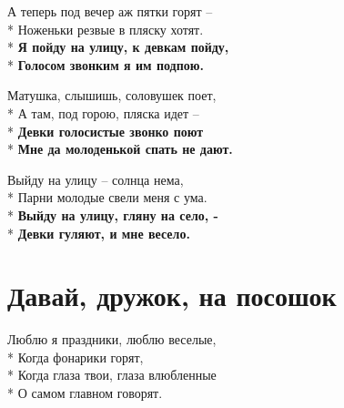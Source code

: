 \medskip

\begin{minipage}{\linewidth}
А теперь под вечер аж пятки горят –\\*
Ноженьки резвые в пляску хотят.\\*
\textbf{Я пойду на улицу, к девкам пойду,}\\*
\textbf{Голосом звонким я им подпою.}\\
\end{minipage}\par\medskip\nobreak

\medskip

\begin{minipage}{\linewidth}
Матушка, слышишь, соловушек поет,\\*
А там, под горою, пляска идет –\\*
\textbf{Девки голосистые звонко поют}\\*
\textbf{Мне да молоденькой спать не дают.}\\
\end{minipage}\par\medskip\nobreak

\medskip

\begin{minipage}{\linewidth}
Выйду на улицу – солнца нема,\\*
Парни молодые свели меня с ума.\\*
\textbf{Выйду на улицу, гляну на село, -}\\*
\textbf{Девки гуляют, и мне весело.}\\
\end{minipage}

\vspace{\fill}\newpage

\section{Давай, дружок, на посошок}
\label{song:Давай,_дружок,_на_посошок}

\medskip

\begin{minipage}{\linewidth}
Люблю я праздники, люблю веселые,\\*
Когда фонарики горят,\\*
Когда глаза твои, глаза влюбленные\\*
О самом главном говорят.\\
\end{minipage}\par\medskip\nobreak

